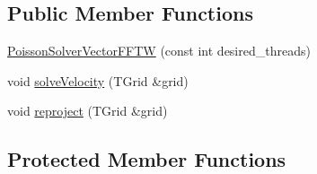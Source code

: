 \subsection*{Public Member Functions}
\begin{DoxyCompactItemize}
\item 
\hyperlink{class_poisson_solver_vector_f_f_t_w_ab2a8369a7aab2b69a26679d1a4f1ba95}{Poisson\+Solver\+Vector\+F\+F\+T\+W} (const int desired\+\_\+threads)
\item 
void \hyperlink{class_poisson_solver_vector_f_f_t_w_add12bb6cb209a6cd2be3c01bd8ee4ec4}{solve\+Velocity} (T\+Grid \&grid)
\item 
void \hyperlink{class_poisson_solver_vector_f_f_t_w_a517b6b196f4cc6fe328e52824d016e0c}{reproject} (T\+Grid \&grid)
\end{DoxyCompactItemize}
\subsection*{Protected Member Functions}
